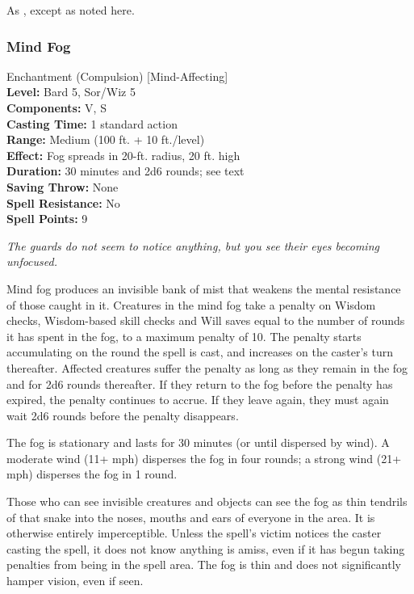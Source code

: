 As , except as noted here.
\subsubsection{Mind Fog}
\label{Spell:MindFog}
Enchantment (Compulsion) [Mind-Affecting]
\\ \textbf{Level:} Bard 5, Sor/Wiz 5
\\ \textbf{Components:} V, S
\\ \textbf{Casting Time:} 1 standard action
\\ \textbf{Range:} Medium (100 ft. + 10 ft./level)
\\ \textbf{Effect:} Fog spreads in 20-ft. radius, 20 ft. high
\\ \textbf{Duration:} 30 minutes and 2d6 rounds; see text
\\ \textbf{Saving Throw:} None
\\ \textbf{Spell Resistance:} No
\\ \textbf{Spell Points:} 9

\emph{The guards do not seem to notice anything, but you see their eyes becoming unfocused.}

Mind fog produces an invisible bank of mist that weakens the mental resistance of those caught in it. 
Creatures in the mind fog take a penalty on Wisdom checks, 
Wisdom-based skill checks and Will saves equal to the number of rounds it has spent in the fog, 
to a maximum penalty of 10.
The penalty starts accumulating on the round the spell is cast, and increases on the caster's turn thereafter.
Affected creatures suffer the penalty as long as they remain in the fog and for 2d6 rounds thereafter.
If they return to the fog before the penalty has expired, the penalty continues to accrue. 
If they leave again, they must again wait 2d6 rounds before the penalty disappears.

The fog is stationary and lasts for 30 minutes (or until dispersed by wind).
A moderate wind (11+ mph) disperses the fog in four rounds; a strong wind (21+ mph) disperses the fog in 1 round.

Those who can see invisible creatures and objects can see the fog as thin tendrils of that snake into the noses, mouths and ears of everyone in the area.
It is otherwise entirely imperceptible. 
Unless the spell's victim notices the caster casting the spell, it does not know anything is amiss, even if it has begun taking penalties from being in the spell area.
The fog is thin and does not significantly hamper vision, even if seen.

